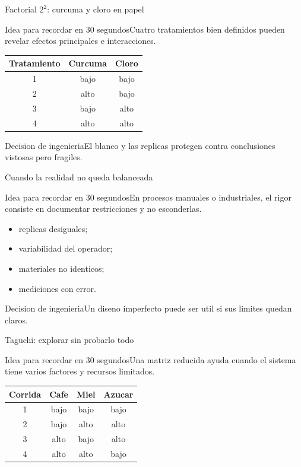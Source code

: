 \documentclass[aspectratio=169,11pt]{beamer}
\newcommand{\idea}[1]{\begin{block}{Idea para recordar en 30 segundos}#1\end{block}}
\newcommand{\decision}[1]{\begin{alertblock}{Decision de ingenieria}#1\end{alertblock}}
\begin{document}
\begin{frame}{Factorial $2^2$: curcuma y cloro en papel}
  \idea{Cuatro tratamientos bien definidos pueden revelar efectos principales e interacciones.}
  \begin{table}
    \centering
    \begin{tabular}{ccc}
      \toprule
      Tratamiento & Curcuma & Cloro \\
      \midrule
      1 & bajo & bajo \\
      2 & alto & bajo \\
      3 & bajo & alto \\
      4 & alto & alto \\
      \bottomrule
    \end{tabular}
  \end{table}
  \decision{El blanco y las replicas protegen contra conclusiones vistosas pero fragiles.}
\end{frame}

\begin{frame}{Cuando la realidad no queda balanceada}
  \idea{En procesos manuales o industriales, el rigor consiste en documentar restricciones y no esconderlas.}
  \begin{itemize}
    \item replicas desiguales;
    \item variabilidad del operador;
    \item materiales no identicos;
    \item mediciones con error.
  \end{itemize}
  \decision{Un diseno imperfecto puede ser util si sus limites quedan claros.}
\end{frame}

\begin{frame}{Taguchi: explorar sin probarlo todo}
  \idea{Una matriz reducida ayuda cuando el sistema tiene varios factores y recursos limitados.}
  \begin{table}
    \centering
    \begin{tabular}{cccc}
      \toprule
      Corrida & Cafe & Miel & Azucar \\
      \midrule
      1 & bajo & bajo & bajo \\
      2 & bajo & alto & alto \\
      3 & alto & bajo & alto \\
      4 & alto & alto & bajo \\
      \bottomrule
    \end{tabular}
  \end{table}
\end{frame}
\end{document}

